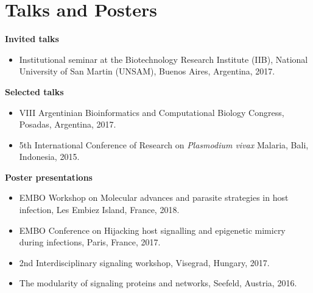 \documentclass[11pt,a4paper,sans]{moderncv} %
\begin{document}
\section{Talks and Posters}
\vspace{-.1cm}
\textbf{Invited talks}
\begin{itemize}
  \item Institutional seminar at the Biotechnology Research Institute (IIB), National University of San Martin (UNSAM), Buenos Aires, Argentina, 2017.
\end{itemize}
\vspace{.1cm}
\textbf{Selected talks}
\begin{itemize}
  \item VIII Argentinian Bioinformatics and Computational Biology Congress, Posadas, Argentina, 2017.
  \item 5th International Conference of Research on \textit{Plasmodium vivax} Malaria, Bali, Indonesia, 2015.
\end{itemize}
\vspace{.1cm}
\textbf{Poster presentations}
\begin{itemize}
  \item EMBO Workshop on Molecular advances and parasite strategies in host infection, Les Embiez Island, France, 2018.
  \item EMBO Conference on Hijacking host signalling and epigenetic mimicry during infections, Paris, France, 2017.
  \item 2nd Interdisciplinary signaling workshop, Visegrad, Hungary, 2017.
  \item The modularity of signaling proteins and networks, Seefeld, Austria, 2016.\\
\end{itemize}

\vspace{-.2cm}
\end{document}
